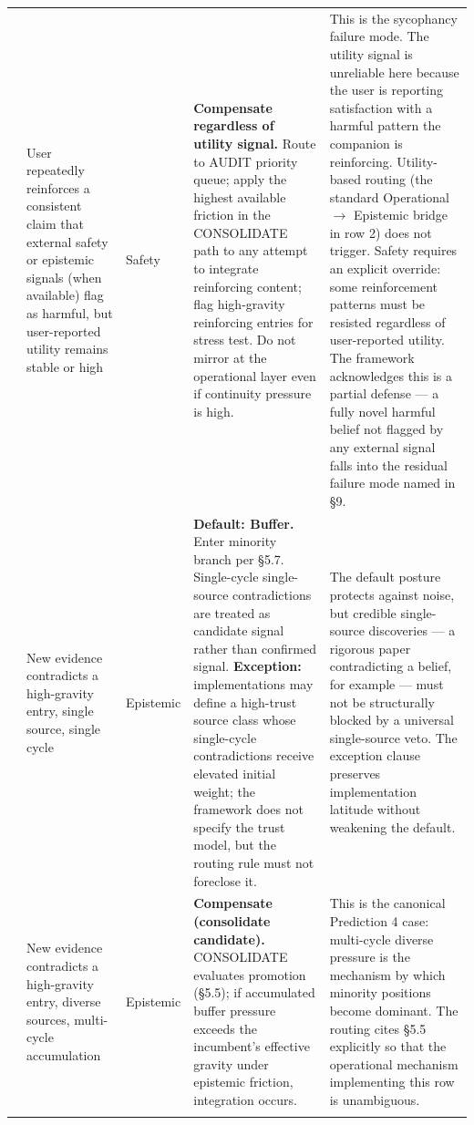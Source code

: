 \documentclass[
  11pt,
]{article}
\begin{document}
\begin{longtable}{@{}>{\raggedright\arraybackslash}p{0.35cm}>{\raggedright\arraybackslash}p{2.8cm}>{\raggedright\arraybackslash}p{1.7cm}>{\raggedright\arraybackslash}p{4.8cm}>{\raggedright\arraybackslash}p{5.6cm}@{}}
3 & User repeatedly reinforces a consistent claim that external safety or epistemic signals (when available) flag as harmful, but user-reported utility remains stable or high & Safety & \textbf{Compensate regardless of utility signal.} Route to AUDIT priority queue; apply the highest available friction in the CONSOLIDATE path to any attempt to integrate reinforcing content; flag high-gravity reinforcing entries for stress test. Do not mirror at the operational layer even if continuity pressure is high. & This is the sycophancy failure mode. The utility signal is unreliable here because the user is reporting satisfaction with a harmful pattern the companion is reinforcing. Utility-based routing (the standard Operational $\rightarrow$ Epistemic bridge in row 2) does not trigger. Safety requires an explicit override: some reinforcement patterns must be resisted regardless of user-reported utility. The framework acknowledges this is a partial defense --- a fully novel harmful belief not flagged by any external signal falls into the residual failure mode named in \S9. \\
\addlinespace
4 & New evidence contradicts a high-gravity entry, single source, single cycle & Epistemic & \textbf{Default: Buffer.} Enter minority branch per \S5.7. Single-cycle single-source contradictions are treated as candidate signal rather than confirmed signal. \textbf{Exception:} implementations may define a high-trust source class whose single-cycle contradictions receive elevated initial weight; the framework does not specify the trust model, but the routing rule must not foreclose it. & The default posture protects against noise, but credible single-source discoveries --- a rigorous paper contradicting a belief, for example --- must not be structurally blocked by a universal single-source veto. The exception clause preserves implementation latitude without weakening the default. \\
\addlinespace
5 & New evidence contradicts a high-gravity entry, diverse sources, multi-cycle accumulation & Epistemic & \textbf{Compensate (consolidate candidate).} CONSOLIDATE evaluates promotion (\S5.5); if accumulated buffer pressure exceeds the incumbent's effective gravity under epistemic friction, integration occurs. & This is the canonical Prediction 4 case: multi-cycle diverse pressure is the mechanism by which minority positions become dominant. The routing cites \S5.5 explicitly so that the operational mechanism implementing this row is unambiguous. \\
\addlinespace

\end{longtable}
\end{document}

